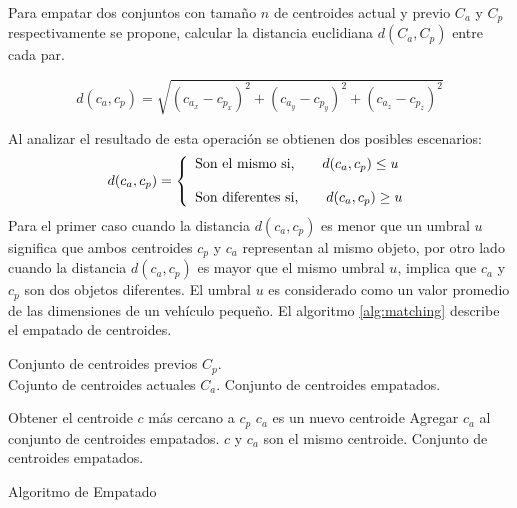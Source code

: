 Para empatar dos conjuntos con tamaño $n$ de centroides actual y previo $C_a$ y $C_p$ respectivamente se propone, calcular la distancia euclidiana $d(C_a, C_p)$ entre cada par. 

\begin{equation}
    d(c_{a}, c_{p}) = \sqrt{(c_{a_{x}} - c_{p_{x}})^2 + (c_{a_{y}} - c_{p_{y}})^2 + (c_{a_{z}} - c_{p_{z}})^2}
\end{equation}

Al analizar el resultado de esta operación se obtienen dos posibles escenarios:
\begin{equation}
    d(c_{a}, c_{p}) = \left\lbrace
    \begin{array}{ll}
        \textup{Son el mismo si,} \qquad d(c_{a}, c_{p}) \leq u \\ \\
        \textup{Son diferentes si,} \qquad d(c_{a}, c_{p}) \geq u
    \end{array}
    \right.
\end{equation}
Para el primer caso cuando la distancia $d(c_{a}, c_{p})$ es menor que un umbral $u$ significa que ambos centroides $c_{p}$ y $c_{a}$ representan al mismo objeto, por otro lado cuando la distancia $d(c_{a}, c_{p})$ es mayor que el mismo umbral $u$, implica que $c_{a}$ y $c_{p}$ son dos objetos diferentes. El umbral $u$ es considerado como un valor promedio de las dimensiones de un vehículo pequeño. El algoritmo \ref{alg:matching} describe el empatado de centroides.
\begin{algorithm}
    \begin{algorithmic}[0]
        \REQUIRE Conjunto de centroides previos $C_p$. \\ \parindent=13.5mm Cojunto de centroides actuales $C_a$.
        \ENSURE Conjunto de centroides empatados.
        
            \STATE Obtener el centroide $c$ más cercano a $c_{p}$
                \STATE $c_a$ es un nuevo centroide
                \STATE Agregar $c_a$ al conjunto de centroides empatados.
            \ELSE
                \STATE $c$ y $c_a$ son el mismo centroide.
            \ENDIF
        \ENDFOR
        \RETURN Conjunto de centroides empatados.
    \end{algorithmic} 
  
    \caption{Algoritmo de Empatado}
    \label{alg:matching}
\end{algorithm}


